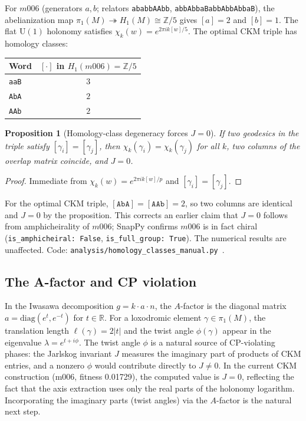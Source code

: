 \documentclass[11pt,a4paper]{article}
\newtheorem{proposition}{Proposition}
\begin{document}
For $m006$ (generators $a,b$; relators \texttt{ababbAAbb},
\texttt{abbAbbaBabbAbbAbbaB}), the abelianization map
$\pi_1(M) \twoheadrightarrow H_1(M) \cong \mathbb{Z}/5$
gives $[a] = 2$ and $[b] = 1$.
The flat $\mathrm{U}(1)$ holonomy satisfies
$\chi_k(w) = e^{2\pi i k [w]/5}$.
The optimal CKM triple has homology classes:
\begin{center}\small
\begin{tabular}{lc}
\toprule
Word & $[\cdot]$ in $H_1(m006)=\mathbb{Z}/5$ \\
\midrule
\texttt{aaB} & $3$ \\
\texttt{AbA} & $2$ \\
\texttt{AAb} & $2$ \\
\bottomrule
\end{tabular}
\end{center}

\begin{proposition}[Homology-class degeneracy forces $J=0$]
\label{prop:hom_class}
If two geodesics in the triple satisfy $[\gamma_i] = [\gamma_j]$,
then $\chi_k(\gamma_i) = \chi_k(\gamma_j)$ for all $k$,
two columns of the overlap matrix coincide, and $J = 0$.
\end{proposition}

\begin{proof}
Immediate from $\chi_k(w) = e^{2\pi ik[w]/p}$ and $[\gamma_i]=[\gamma_j]$.
\end{proof}

For the optimal CKM triple, $[\texttt{AbA}] = [\texttt{AAb}] = 2$,
so two columns are identical and $J = 0$ by the proposition.
This corrects an earlier claim that $J = 0$ follows from
amphicheirality of $m006$; SnapPy confirms $m006$ is in fact
chiral (\texttt{is\_amphicheiral: False}, \texttt{is\_full\_group: True}).
The numerical results are unaffected.
Code: \texttt{analysis/homology\_classes\_manual.py}~\cite{Gentry:Scan}.

\subsection{The A-factor and CP violation}

In the Iwasawa decomposition $g = k \cdot a \cdot n$, the $A$-factor
is the diagonal matrix $a = \mathrm{diag}(e^t, e^{-t})$ for $t \in \mathbb{R}$.
For a loxodromic element $\gamma \in \pi_1(M)$, the translation
length $\ell(\gamma) = 2|t|$ and the twist angle $\phi(\gamma)$
appear in the eigenvalue $\lambda = e^{t + i\phi}$.
The twist angle $\phi$ is a natural source of CP-violating phases:
the Jarlskog invariant $J$ measures the imaginary part of products
of CKM entries, and a nonzero $\phi$ would contribute directly
to $J \neq 0$.
In the current CKM construction (m006, fitness 0.01729), the
computed value is $J = 0$, reflecting the fact that the axis
extraction uses only the real parts of the holonomy logarithm.
Incorporating the imaginary parts (twist angles) via the $A$-factor
is the natural next step.
\end{document}
